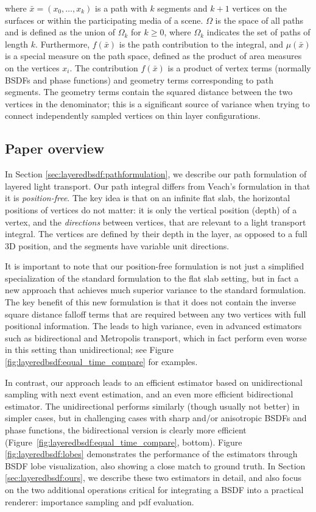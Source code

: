 where $\bar x = (x_0, \dots, x_k)$ is a path with $k$ segments and $k + 1$ vertices on the surfaces or within the participating media of a scene.
$\Omega$ is the space of all paths and is defined as the union of $\Omega_k$ for $k \geq 0$, where $\Omega_k$ indicates the set of paths of length $k$.
Furthermore, $f(\bar x)$ is the path contribution to the integral, and $\mu(\bar x)$ is a special measure on the path space, defined as the product of area measures on the vertices $x_i$. The contribution $f(\bar x)$ is a product of vertex terms (normally BSDFs and phase functions) and geometry terms corresponding to path segments. The geometry terms contain the squared distance between the two vertices in the denominator; this is a significant source of variance when trying to connect independently sampled vertices on thin layer configurations.

\subsection{Paper overview}

In Section \ref{sec:layeredbsdf:pathformulation}, we describe our path formulation of layered light transport. Our path integral differs from Veach's formulation in that it is \emph{position-free}. The key idea is that on an infinite flat slab, the horizontal positions of vertices do not matter: it is only the vertical position (depth) of a vertex, and the \emph{directions} between vertices, that are relevant to a light transport integral. The vertices are defined by their depth in the layer, as opposed to a full 3D position, and the segments have variable unit directions.

It is important to note that our position-free formulation is not just a simplified specialization of the standard formulation to the flat slab setting, but in fact a new approach that achieves much superior variance to the standard formulation. The key benefit of this new formulation is that it does not contain the inverse square distance falloff terms that are required between any two vertices with full positional information. The leads to high variance, even in advanced estimators such as bidirectional and Metropolis transport, which in fact perform even worse in this setting than unidirectional; see Figure \ref{fig:layeredbsdf:equal_time_compare} for examples.

In contrast, our approach leads to an efficient estimator based on unidirectional sampling with next event estimation, and an even more efficient bidirectional estimator. The unidirectional performs similarly (though usually not better) in simpler cases, but in challenging cases with sharp and/or anisotropic BSDFs and phase functions, the bidirectional version is clearly more efficient (Figure~\ref{fig:layeredbsdf:equal_time_compare}, bottom). 
Figure \ref{fig:layeredbsdf:lobes} demonstrates the performance of the estimators through BSDF lobe visualization, also showing a close match to ground truth. In Section \ref{sec:layeredbsdf:ours}, we describe these two estimators in detail, and also focus on the two additional operations critical for integrating a BSDF into a practical renderer: importance sampling and pdf evaluation.

